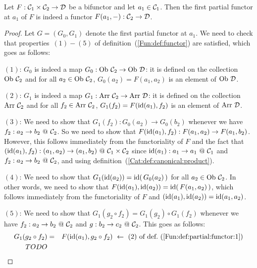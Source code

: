 \begin{prop}\label{Fun:prop:partial:functor:1}
    Let $F:\mbox{${\cal C}_{1}$}\times\mbox{${\cal C}_{2}$}\to\mbox{$\cal D$}$ be a bifunctor and let $a_{1}\in\mbox{${\cal C}_{1}$}$. 
    Then the first partial functor at $a_{1}$ of $F$ is indeed a functor
    $F(a_{1},-):\mbox{${\cal C}_{2}$}\to\mbox{$\cal D$}$.
\end{prop}
\begin{proof}
    Let $G=(G_{0},G_{1})$ denote the first partial functor at $a_{1}$. 
    We need to check that properties~$(1)-(5)$ of 
    definition~(\ref{Fun:def:functor}) are satisfied, which goes as follows:

    $(1)$: $G_{0}$ is indeed a map $G_{0}:\ob\ \Ctwo\to\ob\ \Dat$: it is 
    defined on the collection $\mbox{\rm Ob}\ \mbox{${\cal C}_{2}$}$ and for all $a_{2}\in\mbox{\rm Ob}\ \mbox{${\cal C}_{2}$}$,
    $G_{0}(a_{2})=F(a_{1},a_{2})$ is an element of $\mbox{\rm Ob}\ \mbox{$\cal D$}$.

    $(2)$: $G_{1}$ is indeed a map $G_{1}:\arr\ \Ctwo\to\arr\ \Dat$: it is 
    defined on the collection $\mbox{\rm Arr}\ \mbox{${\cal C}_{2}$}$ and for all $f_{2}\in\mbox{\rm Arr}\ \mbox{${\cal C}_{2}$}$,
    $G_{1}(f_{2})=F(\mbox{\rm id}(a_{1}),f_{2})$ is an element of $\mbox{\rm Arr}\ \mbox{$\cal D$}$.

    $(3)$: We need to show that $G_{1}(f_{2}):G_{0}(a_{2})\to G_{0}(b_{2})$ 
    whenever we have $f_{2}:a_{2}\to b_{2}\ @\ \Ctwo$. So we need to 
    show that $F(\mbox{\rm id}(a_{1}),f_{2}):F(a_{1},a_{2})\to F(a_{1},b_{2})$. However,
    this follows immediately from the functoriality of $F$ and the fact that
    $(\id(a_{1}),f_{2}):(a_{1},a_{2})\to (a_{1},b_{2})\ @\ \Cone\times\Ctwo$
    since $\mbox{\rm id}(a_{1}):a_{1}\to a_{1}\ @\ \mbox{${\cal C}_{1}$}$ and $f_{2}:a_{2}\to b_{2}
    \ @\ \Ctwo$, and using definition~(\ref{Cat:def:canonical:product}).
    
    $(4)$: We need to show that $G_{1}(\mbox{\rm id}(a_{2}))=\mbox{\rm id}(\,G_{0}(a_{2})\,)$ for
    all $a_{2}\in\mbox{\rm Ob}\ \mbox{${\cal C}_{2}$}$. In other words, we need to show that
    $F(\mbox{\rm id}(a_{1}),\mbox{\rm id}(a_{2}))=\mbox{\rm id}(\,F(a_{1},a_{2})\,)$, which follows
    immediately from the functoriality of $F$ and
    $(\mbox{\rm id}(a_{1}),\mbox{\rm id}(a_{2}))=\mbox{\rm id}(a_{1},a_{2})$.

    $(5)$: We need to show that $G_{1}(g_{2}\circ f_{2})=G_{1}(g_{2})
    \circ G_{1}(f_{2})$ whenever we have $f_{2}:a_{2}\to b_{2}\ @\ \Ctwo$ and 
    $g:b_{2}\to c_{2}\ @\ \mbox{${\cal C}_{2}$}$. This goes as follows:
        \begin{eqnarray*}G_{1}(g_{2}\circ f_{2})
            &=&F(\id(a_{1}),g_{2}\circ f_{2})\ \leftarrow\ 
            \mbox{$(2)$ of def.~(\ref{Fun:def:partial:functor:1})}\\
            TODO
        \end{eqnarray*}
 
\end{proof}
